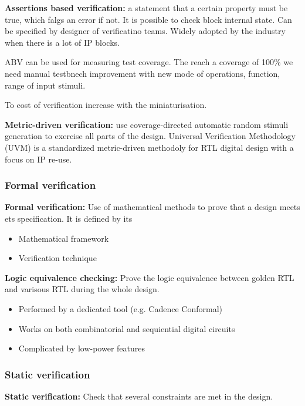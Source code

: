 \textbf{Assertions based verification:} a statement that a certain property must be true, which falgs an error if not. It is possible to check block internal state. Can be specified by designer of verificatino teams. Widely adopted by the industry when there is a lot of IP blocks.

\bigbreak
ABV can be used for measuring test coverage. The reach a coverage of 100\% we need manual testbnech improvement with new mode of operations, function, range of input stimuli. 


To cost of verification increase with the miniaturisation.

\textbf{Metric-driven verification:} use coverage-directed automatic random stimuli generation to exercise all parts of the design. Universal Verification Methodology (UVM) is a standardized metric-driven methodoly for RTL digital design with a focus on IP re-use.
\subsubsection{Formal verification}
\textbf{Formal verification:} Use of mathematical methods to prove that a design meets ets specification. It is defined by its
\begin{itemize}
  \item Mathematical framework
  \item Verification technique
\end{itemize}

\textbf{Logic equivalence checking:} Prove the logic equivalence between golden RTL and varisous RTL during the whole design.
\begin{itemize}
  \item Performed by a dedicated tool (e.g. Cadence Conformal)
  \item Works on both combinatorial and sequiential digital circuits
  \item Complicated by low-power features
\end{itemize}


\subsubsection{Static verification}
\textbf{Static verification: } Check that several constraints are met in the design.
